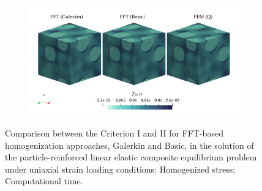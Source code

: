 \begin{figure}[hbt]
\begin{subfigure}[b]{0.49\textwidth}
    \caption{}
    \label{subfig:linear_3D_shear_cpu_time_vs_n_voxels}
  \end{subfigure}
  \begin{subfigure}[b]{\textwidth}
    \centering
    \includegraphics[width=\textwidth]{figures/linear_3D_shear_strain_12}
    \caption{}
    \label{subfig:linear_3D_shear_strain_12}
  \end{subfigure}
\caption{Comparison between the Criterion I and II for FFT-based homogenization approaches, Galerkin and Basic, in the
solution of the particle-reinforced linear elastic composite equilibrium problem under uniaxial
strain loading conditions:  Homogenized stress;  Computational time.}
\label{fig:linear_3D_normal_comparison_crit}
\end{figure}


